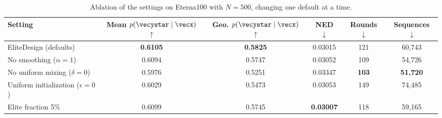 \begin{table}[H]
\centering\small
\renewcommand{\arraystretch}{1.05}
\caption{Ablation of the settings on Eterna100 with $N=500$, changing one default at a time.}
\label{tab:supp-ablation-method}
\begin{tabular*}{\textwidth}{@{\extracolsep{\fill}}lccccc@{}}
\toprule
\textbf{Setting} & \textbf{Mean} $p(\vecystar\mid\vecx)$ $\uparrow$ & \textbf{Geo.} $p(\vecystar\mid\vecx)$ $\uparrow$ & \textbf{NED} $\downarrow$ & \textbf{Rounds} $\downarrow$ & \textbf{Sequences} $\downarrow$ \\
\midrule
EliteDesign (defaults) & \textbf{0.6105} & \textbf{0.5825} & 0.03015 & 121 & 60{,}743 \\
\midrule
No smoothing ($\alpha=1$) & 0.6094 & 0.5747 & 0.03052 & 109 & 54{,}726 \\
No uniform mixing ($\delta=0$) & 0.5976 & 0.5251 & 0.03347 & \textbf{103} & \textbf{51{,}720} \\
Uniform initialization ($\epsilon=0$) & 0.6029 & 0.5473 & 0.03053 & 149 & 74{,}485 \\
Elite fraction 5\% & 0.6099 & 0.5745 & \textbf{0.03007} & 118 & 59{,}165 \\
\bottomrule
\end{tabular*}
\end{table}
